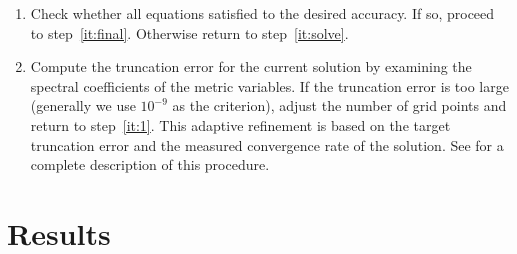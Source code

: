 \begin{enumerate}
\item
\label{it:secondlast}
 Check whether all equations satisfied to the desired
  accuracy. If so, proceed to step~\ref{it:final}. Otherwise return to step~\ref{it:solve}.

\item 
\label{it:final}
Compute the truncation error for the current solution by
  examining the spectral coefficients of the metric variables. If the
  truncation error is too large (generally we use $10^{-9}$ as the criterion), adjust the number of grid points and
  return to step~\ref{it:1}. This adaptive refinement is based on the target truncation error and the measured convergence rate of the solution. See \cite{Szilagyi:2014fna} for a complete description
of this procedure.

\end{enumerate}

\section{Results}
\label{sec:Results}




